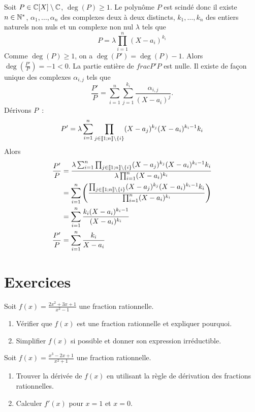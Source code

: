 Soit \(P \in \mathbb{C}[X]\setminus\mathbb{C}\), \(\deg(P)\geqslant 1\). Le polynôme \(P\) est 
scindé donc il existe \(n \in \mathbb{N}^*\), \(\alpha_1, \ldots, \alpha_n\) des 
complexes deux à deux distincts, \(k_1,\ldots, k_n\) des entiers naturels non 
nuls et un complexe non nul \(\lambda\) tels que
\begin{equation}
  P = \lambda \prod_{i=1}^n (X-a_i)^{k_i}
\end{equation}
Comme \(\deg(P)\geqslant 1\), on a \(\deg(P')=\deg(P)-1\). Alors 
\(\deg\left(\frac{P'}{P}\right)=-1<0\). La partie entière de \(frac{P'}{P}\) est 
nulle. Il existe de façon unique des complexes \(\alpha_{i,j}\) tels que
\begin{equation}
  \frac{P'}{P} = \sum_{i=1}^n \sum_{j=1}^{k_i} \frac{\alpha_{i,j}}{(X-a_i)^j}.
\end{equation}
Dérivons \(P\)~:
\begin{equation}
  P' = \lambda \sum_{i=1}^n \prod_{j \in \mathopen{\llbracket}1\mathclose{}\mathpunct{};n\mathclose{\rrbracket} \setminus 
  \{i\}} (X-a_j)^{k_j}(X-a_i)^{k_i-1} k_i
\end{equation}
Alors
\begin{align*}
  \frac{P'}{P} &= \frac{\lambda \sum_{i=1}^n \prod_{j \in 
  \mathopen{\llbracket}1\mathclose{}\mathpunct{};n\mathclose{\rrbracket} \setminus \{i\}} (X-a_j)^{k_j}(X-a_i)^{k_i-1} 
  k_i}{\lambda \prod_{i=1}^n (X-a_i)^{k_i}} \\
  &=\sum_{i=1}^n \left(\frac{\prod_{j \in \mathopen{\llbracket}1\mathclose{}\mathpunct{};n\mathclose{\rrbracket} \setminus 
  \{i\}} (X-a_j)^{k_j}(X-a_i)^{k_i-1} k_i}{\prod_{i=1}^n (X-a_i)^{k_i}} \right) 
  \\
  &=\sum_{i=1}^n \frac{k_i(X-a_i)^{k_i-1}}{(X-a_i)^{k_i}} \\
  \frac{P'}{P} &= \sum_{i=1}^n \frac{k_i}{X-a_i}
\end{align*}
\section{Exercices}
\begin{exercice}
Soit \( f(x) = \frac{2x^2 + 3x + 1}{x^2 - 1} \) une fraction rationnelle.
\begin{enumerate}
    \item Vérifier que \( f(x) \) est une fraction rationnelle et expliquer pourquoi.
    \item Simplifier \( f(x) \) si possible et donner son expression irréductible.
\end{enumerate}
\end{exercice}

\begin{exercice}
Soit \( f(x) = \frac{x^3 - 2x + 1}{x^2 + 1} \) une fraction rationnelle.
\begin{enumerate}
    \item Trouver la dérivée de \( f(x) \) en utilisant la règle de dérivation des fractions rationnelles.
    \item Calculer \( f'(x) \) pour \( x = 1 \) et \( x = 0 \).
\end{enumerate}
\end{exercice}

